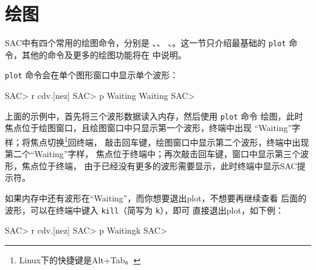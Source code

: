 \section{绘图}
\label{sec:display}

SAC中有四个常用的绘图命令，分别是 、、
、。这一节只介绍最基础的
\texttt{plot} 命令，其他的命令及更多的绘图功能将在
 中说明。

\texttt{plot} 命令会在单个图形窗口中显示单个波形：
\begin{SACCode}
SAC> r cdv.[nez]
SAC> p
Waiting
Waiting
SAC>
\end{SACCode}

上面的示例中，首先将三个波形数据读入内存，然后使用 \texttt{plot} 命令
绘图，此时焦点位于绘图窗口，且绘图窗口中只显示第一个波形，终端中出现
``Waiting''字样；将焦点切换\footnote{Linux下的快捷键是Alt+Tab。}回终端，
敲击回车键，绘图窗口中显示第二个波形，终端中出现第二个``Waiting''字样，
焦点位于终端中；再次敲击回车键，窗口中显示第三个波形，焦点位于终端，
由于已经没有更多的波形需要显示，此时终端中显示SAC提示符。

如果内存中还有波形在``Waiting''，而你想要退出plot，不想要再继续查看
后面的波形，可以在终端中键入 \texttt{kill}（简写为 \texttt{k}），即可
直接退出plot，如下例：
\begin{SACCode}
SAC> r cdv.[nez]
SAC> p
Waitingk
SAC>
\end{SACCode}
